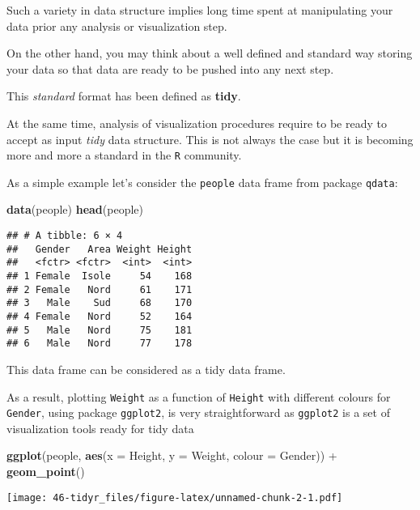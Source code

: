 \documentclass[]{book}
\newenvironment{Shaded}{\begin{snugshade}}{\end{snugshade}}
\newcommand{\KeywordTok}[1]{\textcolor[rgb]{0.13,0.29,0.53}{\textbf{{#1}}}}
\newcommand{\DataTypeTok}[1]{\textcolor[rgb]{0.13,0.29,0.53}{{#1}}}
\newcommand{\StringTok}[1]{\textcolor[rgb]{0.31,0.60,0.02}{{#1}}}
\newcommand{\NormalTok}[1]{{#1}}
\begin{document}
Such a variety in data structure implies long time spent at manipulating
your data prior any analysis or visualization step.

On the other hand, you may think about a well defined and standard way
storing your data so that data are ready to be pushed into any next
step.

This \emph{standard} format has been defined as \textbf{tidy}.

At the same time, analysis of visualization procedures require to be
ready to accept as input \emph{tidy} data structure. This is not always
the case but it is becoming more and more a standard in the \texttt{R}
community.

As a simple example let's consider the \texttt{people} data frame from
package \texttt{qdata}:

\begin{Shaded}
\begin{Highlighting}[]
\KeywordTok{data}\NormalTok{(people)}
\KeywordTok{head}\NormalTok{(people)}
\end{Highlighting}
\end{Shaded}

\begin{verbatim}
## # A tibble: 6 × 4
##   Gender   Area Weight Height
##   <fctr> <fctr>  <int>  <int>
## 1 Female  Isole     54    168
## 2 Female   Nord     61    171
## 3   Male    Sud     68    170
## 4 Female   Nord     52    164
## 5   Male   Nord     75    181
## 6   Male   Nord     77    178
\end{verbatim}

This data frame can be considered as a tidy data frame.

As a result, plotting \texttt{Weight} as a function of \texttt{Height}
with different colours for \texttt{Gender}, using package
\texttt{ggplot2}, is very straightforward as \texttt{ggplot2} is a set
of visualization tools ready for tidy data

\begin{Shaded}
\begin{Highlighting}[]
\KeywordTok{ggplot}\NormalTok{(people, }\KeywordTok{aes}\NormalTok{(}\DataTypeTok{x =} \NormalTok{Height, }\DataTypeTok{y =} \NormalTok{Weight, }\DataTypeTok{colour =} \NormalTok{Gender)) +}\StringTok{ }\KeywordTok{geom_point}\NormalTok{()}
\end{Highlighting}
\end{Shaded}

\texttt{[image: 46-tidyr\_files/figure-latex/unnamed-chunk-2-1.pdf]}
\end{document}
